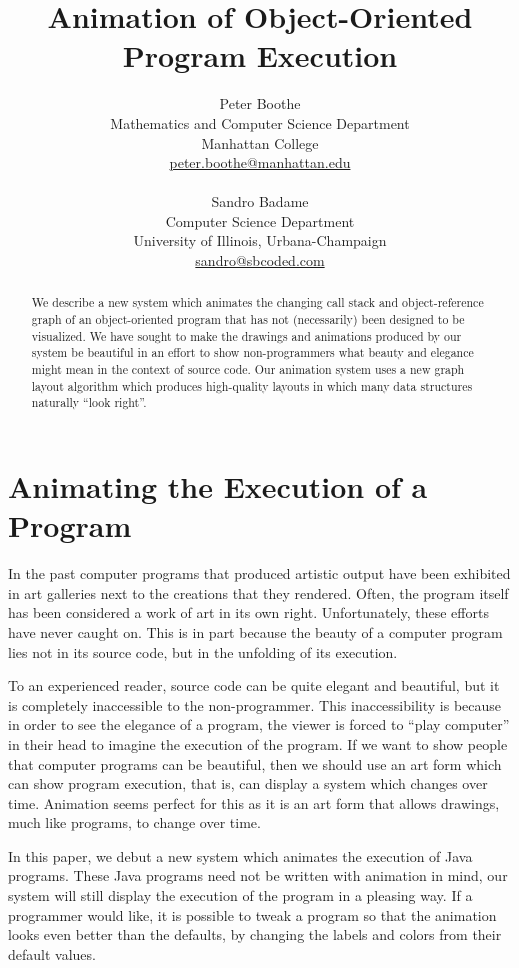 \documentclass[11pt]{article}
\title{\textbf{Animation of Object-Oriented Program Execution}}
\author{
 	Peter Boothe\\
	Mathematics and Computer Science Department \\
	Manhattan College \\
	\url{peter.boothe@manhattan.edu}\\
        \\
 	Sandro Badame \\
	Computer Science Department \\
	University of Illinois, Urbana-Champaign \\
	\url{sandro@sbcoded.com}
}
\date{}
\begin{document}
\maketitle

\thispagestyle{empty}

\begin{abstract}

We describe a new system which animates the changing call stack and
object-reference graph of an object-oriented program that has not (necessarily)
been designed to be visualized.  We have sought to make the drawings and
animations produced by our system be beautiful in an effort to show
non-programmers what beauty and elegance might mean in the context of source
code.  Our animation system uses a new graph layout algorithm which produces
high-quality layouts in which many data structures naturally ``look right''.

\end{abstract}

\section{Animating the Execution of a Program}

In the past computer programs that produced artistic output have been exhibited
in art galleries next to the creations that they rendered. Often, the
program itself has been considered a work of art in its own right.
 Unfortunately, these efforts have never caught on.  This is in part
because the beauty of a computer program lies not in its source code, but in
the unfolding of its execution.

To an experienced reader, source code can be quite elegant and beautiful, but
it is completely inaccessible to the non-programmer.  This inaccessibility is
because in order to see the elegance of a program, the viewer is forced to
``play computer'' in their head to imagine the execution of the program.  If we
want to show people that computer programs can be beautiful, then we should use
an art form which can show program execution, that is, can display a system
which changes over time. Animation seems perfect for this as it is an art form
that allows drawings, much like programs, to change over time. 

In this paper, we debut a new system which animates the execution of Java
programs.  These Java programs need not be written with animation in mind, our
system will still display the execution of the program in a pleasing way.  If a
programmer would like, it is possible to tweak a program so that the
animation looks even better than the defaults, by changing the labels and
colors from their default values.
\end{document}
